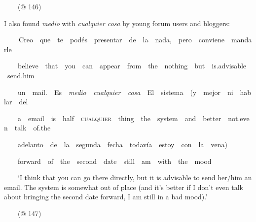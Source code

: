 \begin{styleStandard}
\ \ \ \ (@ 146)
\end{styleStandard}

\begin{styleStandard}
I also found \textit{medio} with \textit{cualquier cosa} by young forum users and bloggers:
\end{styleStandard}

\begin{styleStandard}
\textbf{\ \ }\ \ Creo\ \ que\ \ te\ \ podés\ \ presentar\ \ de\ \ la\ \ nada,\ \ pero\ \ conviene\ \ mandarle
\end{styleStandard}

\begin{styleStandard}
\ \ \ \ believe\ \ that\ \ you\ \ can\ \ appear\ \ from\ \ the\ \ nothing\ \ but\ \ is.advisable\ \ send.him
\end{styleStandard}

\begin{styleStandard}
\ \ \ \ un\ \ mail.\ \ Es\ \ \textit{medio\ \ cualquier\ \ cosa\ \ }El\ \ sistema\ \ (y\ \ mejor\ \ ni\ \ hablar\ \ del
\end{styleStandard}

\begin{styleStandard}
\ \ \ \ a\ \ email\ \ is\ \ half\ \ \textsc{cualquier}\ \ thing\ \ the\ \ system\ \ and\ \ better\ \ not.even\ \ talk\ \ of.the
\end{styleStandard}

\begin{styleStandard}
\ \ \ \ adelanto\ \ de\ \ la\ \ segunda\ \ fecha\ \ todavía\ \ estoy\ \ con\ \ la\ \ vena)
\end{styleStandard}

\begin{styleStandard}
\ \ \ \ forward\ \ of\ \ the\ \ second\ \ date\ \ still\ \ am\ \ with\ \ the\ \ mood
\end{styleStandard}

\begin{styleStandard}
\ \ \ \ ‘I think that you can go there directly, but it is advisable to send her/him an email. The system is somewhat out of place (and it’s better if I don’t even talk about bringing the second date forward, I am still in a bad mood).’
\end{styleStandard}

\begin{styleStandard}
\ \ \ \ (@ 147)
\end{styleStandard}

